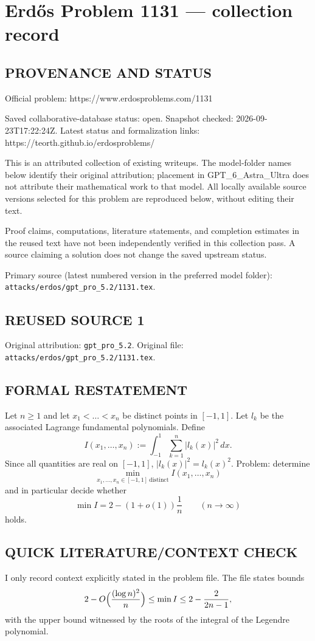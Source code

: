 \section*{Erd\H{o}s Problem 1131 --- collection record}

\subsection*{PROVENANCE AND STATUS}
Official problem: https://www.erdosproblems.com/1131

Saved collaborative-database status: open.
Snapshot checked: 2026-09-23T17:22:24Z.
Latest status and formalization links: https://teorth.github.io/erdosproblems/

This is an attributed collection of existing writeups. The model-folder names below identify their original attribution; placement in GPT\_6\_Astra\_Ultra does not attribute their mathematical work to that model. All locally available source versions selected for this problem are reproduced below, without editing their text.

Proof claims, computations, literature statements, and completion estimates in the reused text have not been independently verified in this collection pass. A source claiming a solution does not change the saved upstream status.

Primary source (latest numbered version in the preferred model folder): \texttt{attacks/erdos/gpt\_pro\_5.2/1131.tex}.

\subsection*{REUSED SOURCE 1}
Original attribution: \texttt{gpt\_pro\_5.2}.
Original file: \texttt{attacks/erdos/gpt\_pro\_5.2/1131.tex}.


\subsection*{FORMAL RESTATEMENT}
Let $n\ge 1$ and let $x_1<\dots<x_n$ be distinct points in $[-1,1]$.
Let $l_k$ be the associated Lagrange fundamental polynomials.
Define
\[
I(x_1,\dots,x_n):=\int_{-1}^1\sum_{k=1}^n |l_k(x)|^2\,dx.
\]
Since all quantities are real on $[-1,1]$, $|l_k(x)|^2=l_k(x)^2$.
Problem: determine
\[
\min_{x_1,\dots,x_n\in[-1,1]\ \text{distinct}} I(x_1,\dots,x_n)
\]
and in particular decide whether
\[
\min I = 2-(1+o(1))\frac{1}{n}\qquad (n\to\infty)
\]
holds.

\subsection*{QUICK LITERATURE/CONTEXT CHECK}
I only record context explicitly stated in the problem file.
The file states bounds
\[
2-O\Bigl(\frac{(\log n)^2}{n}\Bigr)\le \min I\le 2-\frac{2}{2n-1},
\]
with the upper bound witnessed by the roots of the integral of the Legendre polynomial.

